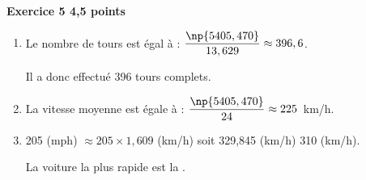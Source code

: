 \textbf{Exercice 5 \hfill 4,5 points}

\medskip

%
%
%
%
%
%
%
%
%

\begin{enumerate}
\item %
Le nombre de tours est égal à : $\dfrac{\np{5405,470}}{13,629} \approx 396,6$.

Il a donc effectué 396 tours complets.
\item %
La vitesse moyenne est égale à : $\dfrac{\np{5405,470}}{24} \approx 225$~km/h.
\item %

%

205 (mph) $\approx 205 \times 1,609$ (km/h) soit  329,845 (km/h)  310 (km/h).

La voiture la plus rapide est la .
\end{enumerate}

\vspace{0,5cm}

